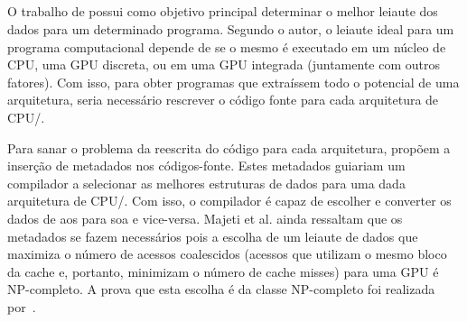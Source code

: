
\subsection{}

O trabalho de  possui como objetivo principal determinar o melhor leiaute dos dados para um determinado programa. Segundo o autor, o leiaute ideal para um programa computacional depende de se o mesmo é executado em um núcleo de CPU, uma GPU discreta, ou em uma GPU integrada (juntamente com outros fatores). Com isso, para obter programas que extraíssem todo o potencial de uma arquitetura, seria necessário rescrever o código fonte para cada arquitetura de CPU\@/\@GPU.

Para sanar o problema da reescrita do código para cada arquitetura,  propõem a inserção de metadados nos códigos-fonte. Estes metadados guiariam um compilador a selecionar as melhores estruturas de dados para uma dada arquitetura de CPU\@/\@GPU. Com isso, o compilador é capaz de escolher e converter os dados de \ac{aos} para \ac{soa} e vice-versa.
Majeti et al. ainda ressaltam que os metadados se fazem necessários pois a escolha de um leiaute de dados que maximiza o número de acessos coalescidos (acessos que utilizam o mesmo bloco da cache e, portanto, minimizam o número de cache misses) para uma GPU é NP-completo. A prova que esta escolha é da classe NP-completo foi realizada por~.


